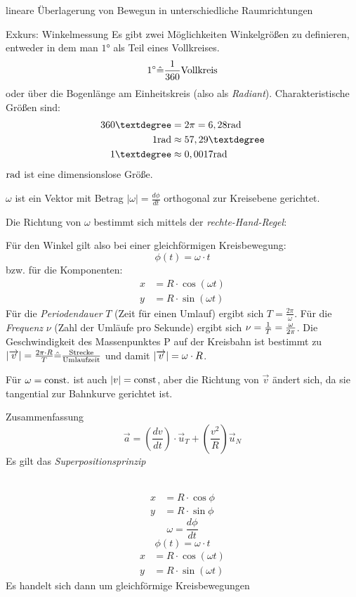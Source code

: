 \documentclass[a4paper,10pt]{scrartcl}
\begin{document}
\begin{seg}{lineare Überlagerung von Bewegun in unterschiedliche Raumrichtungen}
\begin{seg}{Exkurs: Winkelmessung}
Es gibt zwei Möglichkeiten Winkelgrößen zu definieren, entweder in dem man $1$° als Teil eines Vollkreises.
\[
1^\circ \hat = \frac{1}{360} \text{Vollkreis}
\]
oder über die Bogenlänge am Einheitskreis (also als \emph{Radiant}). Charakteristische Größen sind:
\begin{align*}
360°&=2\pi=6,28 \rad\\
1 \rad &\approx 57,29°\\
1°&\approx 0,0017 \rad
\end{align*}
$\text{rad}$ ist eine dimensionslose Größe.
\end{seg}
$\omega$ ist ein Vektor mit Betrag $|\omega|=\frac{d\phi}{dt}$ orthogonal zur Kreisebene gerichtet.
\begin{figure}[h]
\end{figure}
Die Richtung von $\omega$ bestimmt sich mittels der \emph{rechte-Hand-Regel}:
\begin{figure}[h]
\end{figure}
Für den Winkel gilt also bei einer gleichförmigen Kreisbewegung:
\[
\phi(t)=\omega\cdot t
\]
bzw. für die Komponenten:
\begin{align*}
x&=R\cdot \cos(\omega t)\\
y&=R\cdot \sin(\omega t)
\end{align*}
Für die \emph{Periodendauer} $T$ (Zeit für einen Umlauf) ergibt sich $T=\frac{2\pi}{\omega}$. Für die \emph{Frequenz} $\nu$ (Zahl der Umläufe pro Sekunde) ergibt sich $\nu=\frac{1}{T}=\frac{\omega}{2\pi}$. Die Geschwindigkeit des Massenpunktes P auf der Kreisbahn ist bestimmt zu $|\overrightarrow{v}|=\frac{2\pi\cdot R}{T} \hat=\frac{\text{Strecke}}{\text{Umlaufzeit}}$ und damit $|\overrightarrow{v}|=\omega \cdot R$.

Für $\omega=\text{const.}$ ist auch $|v|=\text{const}$, aber die Richtung von $\vec v$ ändert sich, da sie tangential zur Bahnkurve gerichtet ist. 
\end{seg}
\begin{seg}{Zusammenfassung}
 \fixme[fig31]\\
\[
 \vec a = \left ( \frac{dv}{dt}\right ) \cdot \vec u_T + \left ( \frac{v^2}{R} \right ) \vec u_N
\]
Es gilt das \emph{Superpositionsprinzip}
\end{seg}
\begin{sg}[Kreisbewegung]
 \fixme[fig32]\\
\begin{align*}
 x&=R\cdot \cos \phi\\
 y&=R\cdot \sin \phi
\end{align*}
\[
 \omega= \frac{d\phi}{dt}
\]
\[
 \phi(t)=\omega\cdot t
\]
\begin{align*}
 x&=R\cdot \cos(\omega t)\\
 y &= R \cdot \sin(\omega t)
\end{align*}
Es handelt sich dann um gleichförmige Kreisbewegungen


\end{sg}
\end{document}
